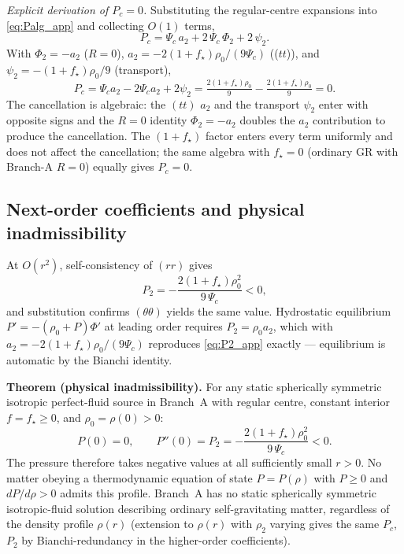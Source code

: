 \documentclass[aps,prd,twocolumn,nofootinbib,floatfix,superscriptaddress]{revtex4-2}
\begin{document}
\emph{Explicit derivation of $P_c=0$.} Substituting the
regular-centre expansions into \eqref{eq:Palg_app} and collecting
$O(1)$ terms,
\begin{equation}
P_c = \Psi_c\,a_2 + 2\,\Psi_c\,\Phi_2 + 2\,\psi_2.
\end{equation}
With $\Phi_2 = -a_2$ ($R=0$), $a_2=-2(1+f_\star)\rho_0/(9\Psi_c)$
(($tt$)), and $\psi_2=-(1+f_\star)\rho_0/9$ (transport),
\begin{equation}
P_c = \Psi_c a_2 - 2\Psi_c a_2 + 2\psi_2
    = \tfrac{2(1+f_\star)\rho_0}{9} - \tfrac{2(1+f_\star)\rho_0}{9}
    = 0.
\end{equation}
The cancellation is algebraic: the $(tt)$ $a_2$ and the transport
$\psi_2$ enter with opposite signs and the $R=0$ identity
$\Phi_2=-a_2$ doubles the $a_2$ contribution to produce the
cancellation. The $(1+f_\star)$ factor enters every term uniformly
and does not affect the cancellation; the same algebra with
$f_\star=0$ (ordinary GR with Branch-A $R=0$) equally gives $P_c=0$.

\subsection{Next-order coefficients and physical inadmissibility}

At $O(r^2)$, self-consistency of $(rr)$ gives
\begin{equation}
\label{eq:P2_app}
P_2 = -\frac{2(1+f_\star)\rho_0^2}{9\,\Psi_c} < 0,
\end{equation}
and substitution confirms $(\theta\theta)$ yields the same value.
Hydrostatic equilibrium $P'=-(\rho_0+P)\Phi'$ at leading order
requires $P_2=\rho_0 a_2$, which with $a_2=-2(1+f_\star)\rho_0/(9\Psi_c)$
reproduces \eqref{eq:P2_app} exactly --- equilibrium is automatic by
the Bianchi identity.

\textbf{Theorem (physical inadmissibility).} For any static
spherically symmetric isotropic perfect-fluid source in Branch~A
with regular centre, constant interior $f=f_\star\geq 0$, and
$\rho_0=\rho(0)>0$:
\begin{equation}
P(0) = 0,
\qquad
P''(0) = P_2 = -\frac{2(1+f_\star)\rho_0^2}{9\,\Psi_c} < 0.
\end{equation}
The pressure therefore takes negative values at all sufficiently
small $r>0$. No matter obeying a thermodynamic equation of state
$P=P(\rho)$ with $P\geq 0$ and $dP/d\rho>0$ admits this profile.
Branch~A has no static spherically symmetric isotropic-fluid
solution describing ordinary self-gravitating matter, regardless
of the density profile $\rho(r)$ (extension to $\rho(r)$ with
$\rho_2$ varying gives the same $P_c$, $P_2$ by Bianchi-redundancy
in the higher-order coefficients).
\end{document}

